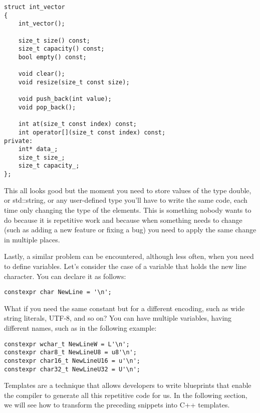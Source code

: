 \begin{lstlisting}[style=styleCXX]
struct int_vector
{
	int_vector();
	
	size_t size() const;
	size_t capacity() const;
	bool empty() const;
	
	void clear();
	void resize(size_t const size);
	
	void push_back(int value);
	void pop_back();
	
	int at(size_t const index) const;
	int operator[](size_t const index) const;
private:
	int* data_;
	size_t size_;
	size_t capacity_;
};
\end{lstlisting}

This all looks good but the moment you need to store values of the type double, or std::string, or any user-defined type you'll have to write the same code, each time only changing the type of the elements. This is something nobody wants to do because it is repetitive work and because when something needs to change (such as adding a new feature or fixing a bug) you need to apply the same change in multiple places.

Lastly, a similar problem can be encountered, although less often, when you need to define variables. Let's consider the case of a variable that holds the new line character. You can declare it as follows:

\begin{lstlisting}[style=styleCXX]
constexpr char NewLine = '\n';
\end{lstlisting}

What if you need the same constant but for a different encoding, such as wide string literals, UTF-8, and so on? You can have multiple variables, having different names, such as in the following example:

\begin{lstlisting}[style=styleCXX]
constexpr wchar_t NewLineW = L'\n';
constexpr char8_t NewLineU8 = u8'\n';
constexpr char16_t NewLineU16 = u'\n';
constexpr char32_t NewLineU32 = U'\n';
\end{lstlisting}

Templates are a technique that allows developers to write blueprints that enable the compiler to generate all this repetitive code for us. In the following section, we will see how to transform the preceding snippets into C++ templates.







